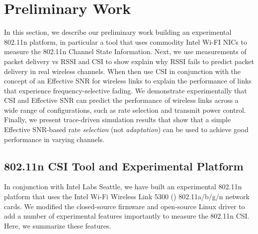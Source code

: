 \section{Preliminary Work}
\label{sec:preliminary}

In this section, we describe our preliminary work building an experimental 802.11n platform, in particular a tool that uses commodity Intel Wi-FI NICs to measure the 802.11n Channel State Information. Next, we use measurements of packet delivery vs RSSI and CSI to show explain why RSSI fails to predict packet delivery in real wireless channels. When then use CSI in conjunction with the concept of an Effective SNR for wireless links to explain the performance of links that experience frequency-selective fading. We demonstrate experimentally that CSI and Effective SNR can predict the performance of wireless links across a wide range of configurations, such as rate selection and transmit power control. Finally, we present trace-driven simulation results that show that a simple Effective SNR-based rate \emph{selection} (not \emph{adaptation}) can be used to achieve good performance in varying channels.

\subsection{802.11n CSI Tool and Experimental Platform}
\label{sec:platform}
In conjunction with Intel Labs Seattle, we have built an experimental 802.11n platform that uses the Intel Wi-Fi Wireless Link 5300 () 802.11a/b/g/n network cards. We modified the closed-source firmware and open-source Linux driver to add a number of experimental features importantly to measure the 802.11n CSI. Here, we summarize these features.


